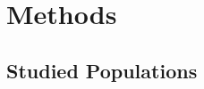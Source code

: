 \documentclass[11pt]{article}
\begin{document}

\vspace{5mm}
\section{Methods}





\subsection{Studied Populations}
\end{document}

